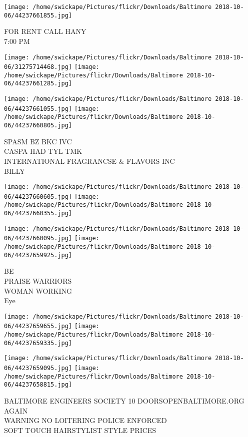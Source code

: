 \documentclass[10pt,letterpaper]{article}
\begin{document}
\vspace{0.25in}
\texttt{[image: /home/swickape/Pictures/flickr/Downloads/Baltimore 2018-10-06/44237661855.jpg]}

FOR RENT CALL HANY\\
7:00 PM\\
\pagebreak

\texttt{[image: /home/swickape/Pictures/flickr/Downloads/Baltimore 2018-10-06/31275714468.jpg]}
\texttt{[image: /home/swickape/Pictures/flickr/Downloads/Baltimore 2018-10-06/44237661285.jpg]}

\texttt{[image: /home/swickape/Pictures/flickr/Downloads/Baltimore 2018-10-06/44237661055.jpg]}
\texttt{[image: /home/swickape/Pictures/flickr/Downloads/Baltimore 2018-10-06/44237660805.jpg]}

SPASM BZ BKC IVC\\
CASPA HAD TYL TMK\\
INTERNATIONAL FRAGRANCSE \& FLAVORS INC\\
BILLY\\
\pagebreak

\texttt{[image: /home/swickape/Pictures/flickr/Downloads/Baltimore 2018-10-06/44237660605.jpg]}
\texttt{[image: /home/swickape/Pictures/flickr/Downloads/Baltimore 2018-10-06/44237660355.jpg]}

\texttt{[image: /home/swickape/Pictures/flickr/Downloads/Baltimore 2018-10-06/44237660095.jpg]}
\texttt{[image: /home/swickape/Pictures/flickr/Downloads/Baltimore 2018-10-06/44237659925.jpg]}

BE\\
PRAISE WARRIORS\\
WOMAN WORKING\\
Eye\\
\pagebreak

\texttt{[image: /home/swickape/Pictures/flickr/Downloads/Baltimore 2018-10-06/44237659655.jpg]}
\texttt{[image: /home/swickape/Pictures/flickr/Downloads/Baltimore 2018-10-06/44237659335.jpg]}

\texttt{[image: /home/swickape/Pictures/flickr/Downloads/Baltimore 2018-10-06/44237659095.jpg]}
\texttt{[image: /home/swickape/Pictures/flickr/Downloads/Baltimore 2018-10-06/44237658815.jpg]}

BALTIMORE ENGINEERS SOCIETY 10 DOORSOPENBALTIMORE.ORG\\
AGAIN\\
WARNING NO LOITERING POLICE ENFORCED\\
SOFT TOUCH HAIRSTYLIST STYLE PRICES\\
\pagebreak
\end{document}

